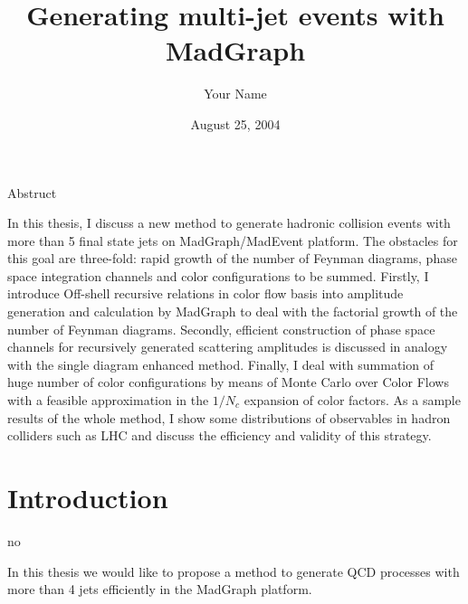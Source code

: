 \documentclass{book}
\title{Generating multi-jet events with MadGraph}
\author{Your Name}
\date{August 25, 2004}
\begin{document}
\maketitle
\tableofcontents


Abstruct

In this thesis, I discuss a new method to generate hadronic collision events with more than 5 final state jets on MadGraph/MadEvent  platform. The obstacles for this goal are three-fold: rapid growth of the number of Feynman diagrams,  phase space integration channels and color configurations to be summed. Firstly, I introduce Off-shell recursive relations in color flow basis into amplitude generation and calculation by MadGraph to deal with the factorial growth of the number of Feynman diagrams. Secondly,  efficient construction of phase space channels for recursively generated scattering amplitudes is discussed in analogy with the single diagram enhanced method. Finally, I deal with summation of huge number of color configurations by means of Monte Carlo over Color Flows with a feasible approximation in the $1/N_c$ expansion of color factors. As a sample results of the whole method, I show some distributions of observables in hadron colliders  such as LHC and discuss the efficiency and validity of this strategy.

\chapter{Introduction}
no

In this thesis we would like to propose a method to generate QCD processes with more than 4 jets efficiently in the MadGraph platform.
\end{document}
